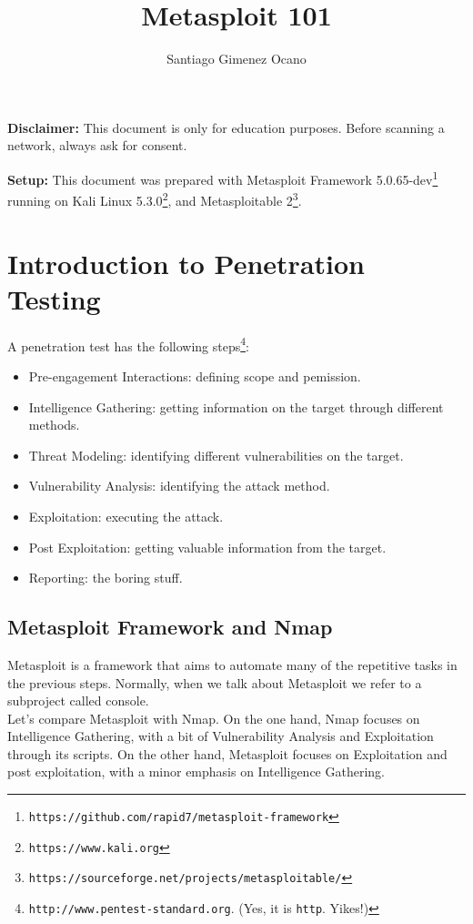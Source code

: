 \documentclass[twocolumn]{article}
\title{Metasploit 101}
\author{Santiago Gimenez Ocano}
\date{}
\begin{document}
\maketitle

\noindent \textbf{Disclaimer:} This document is only for education purposes. Before scanning a network, always ask for consent.

\noindent \textbf{Setup:} This document was prepared with Metasploit Framework 5.0.65-dev\footnote{\texttt{https://github.com/rapid7/metasploit-framework}} running on Kali Linux 5.3.0\footnote{\texttt{https://www.kali.org}}, and Metasploitable 2\footnote{\texttt{https://sourceforge.net/projects/metasploitable/}}.

\section{Introduction to Penetration Testing}
A penetration test has the following steps\footnote{\texttt{http://www.pentest-standard.org}. (Yes, it is \texttt{http}. Yikes!)}:

\begin{itemize}
    \setlength\itemsep{-0.25em}
    \item Pre-engagement Interactions: defining scope and pemission.
    \item Intelligence Gathering: getting information on the target through different methods.
    \item Threat Modeling: identifying different vulnerabilities on the target.
    \item Vulnerability Analysis: identifying the attack method.
    \item Exploitation: executing the attack.
    \item Post Exploitation: getting valuable information from the target.
    \item Reporting: the boring stuff.
\end{itemize}

\subsection{Metasploit Framework and Nmap}
Metasploit is a framework that aims to automate many of the repetitive tasks in the previous steps. Normally, when we talk about Metasploit we refer to a subproject called console. \\

\noindent Let's compare Metasploit with Nmap. On the one hand, Nmap focuses on Intelligence Gathering, with a bit of Vulnerability Analysis and Exploitation through its scripts. On the other hand, Metasploit focuses on Exploitation and post exploitation, with a minor emphasis on Intelligence Gathering.
\end{document}
